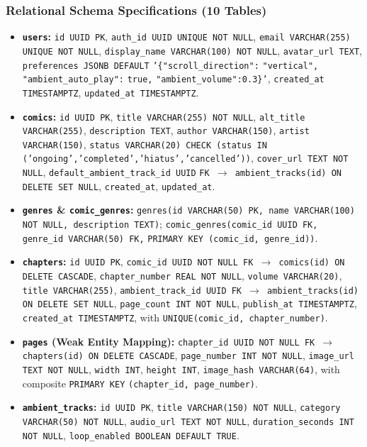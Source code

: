 \subsubsection{Relational Schema Specifications (10 Tables)}
\begin{itemize}
    \item \textbf{\texttt{users}:} \texttt{id UUID PK}, \texttt{auth\_id UUID UNIQUE NOT NULL}, \texttt{email VARCHAR(255) UNIQUE NOT NULL}, \texttt{display\_name VARCHAR(100) NOT NULL}, \texttt{avatar\_url TEXT}, \texttt{preferences JSONB DEFAULT} \allowbreak \texttt{'\{"scroll\_direction":} \allowbreak \texttt{"vertical",} \allowbreak \texttt{"ambient\_auto\_play":} \allowbreak \texttt{true,} \allowbreak \texttt{"ambient\_volume":0.3\}'}, \texttt{created\_at TIMESTAMPTZ}, \texttt{updated\_at TIMESTAMPTZ}.
    \item \textbf{\texttt{comics}:} \texttt{id UUID PK}, \texttt{title VARCHAR(255) NOT NULL}, \texttt{alt\_title VARCHAR(255)}, \texttt{description TEXT}, \texttt{author VARCHAR(150)}, \texttt{artist VARCHAR(150)}, \texttt{status VARCHAR(20) CHECK (status IN ('ongoing','completed','hiatus','cancelled'))}, \texttt{cover\_url TEXT NOT NULL}, \texttt{default\_ambient\_track\_id UUID} \allowbreak \texttt{FK $\to$ ambient\_tracks(id) ON DELETE SET NULL}, \texttt{created\_at}, \texttt{updated\_at}.
    \item \textbf{\texttt{genres} \& \texttt{comic\_genres}:} \texttt{genres(id VARCHAR(50) PK, name VARCHAR(100) NOT NULL, description TEXT)}; \texttt{comic\_genres(comic\_id UUID FK, genre\_id VARCHAR(50) FK,} \allowbreak \texttt{PRIMARY KEY (comic\_id, genre\_id))}.
    \item \textbf{\texttt{chapters}:} \texttt{id UUID PK}, \texttt{comic\_id UUID NOT NULL FK $\to$ comics(id) ON DELETE CASCADE}, \texttt{chapter\_number REAL NOT NULL}, \texttt{volume VARCHAR(20)}, \texttt{title VARCHAR(255)}, \texttt{ambient\_track\_id UUID FK $\to$ ambient\_tracks(id) ON DELETE SET NULL}, \texttt{page\_count INT NOT NULL}, \texttt{publish\_at TIMESTAMPTZ}, \texttt{created\_at TIMESTAMPTZ}, with \texttt{UNIQUE(comic\_id, chapter\_number)}.
    \item \textbf{\texttt{pages} (Weak Entity Mapping):} \texttt{chapter\_id UUID NOT NULL FK $\to$ chapters(id) ON DELETE CASCADE}, \texttt{page\_number INT NOT NULL}, \texttt{image\_url TEXT NOT NULL}, \texttt{width INT}, \texttt{height INT}, \texttt{image\_hash VARCHAR(64)}, with composite \texttt{PRIMARY KEY} \allowbreak \texttt{(chapter\_id, page\_number)}.
    \item \textbf{\texttt{ambient\_tracks}:} \texttt{id UUID PK}, \texttt{title VARCHAR(150) NOT NULL}, \texttt{category VARCHAR(50) NOT NULL}, \texttt{audio\_url TEXT NOT NULL}, \texttt{duration\_seconds INT NOT NULL}, \texttt{loop\_enabled BOOLEAN DEFAULT TRUE}.

\end{itemize}
